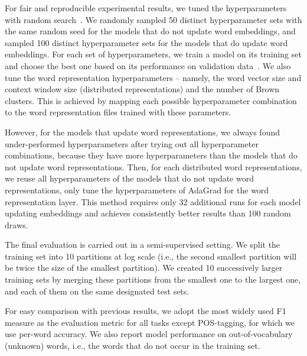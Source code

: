 For fair and reproducible experimental results, we tuned the hyperparameters with random search~\cite{bergstra2012random}. 
We randomly sampled 50 distinct hyperparameter sets with the same random seed for the models that do not update word embeddings, and sampled 100 distinct hyperparameter sets for the models that do update word embeddings. 
For each set of hyperparameters, we train a model on its training set and choose the best one based on its performance on validation data~\cite{turian2010word}. 
We also tune the word representation hyperparameters -- namely, the word vector size and context window size (distributed representations) and the number of Brown clusters.
This is achieved by mapping each possible hyperparameter combination to the word representation files trained with these parameters. 

However, for the models that update word representations, we always found under-performed hyperparameters after trying out all hyperparameter combinations, because they have more hyperparameters than the models that do not update word representations. Then, for each distributed word representations, we reuse all hyperparameters of the models that do not update word representations, only tune the hyperparameters of AdaGrad for the word representation layer. This method requires only 32 additional runs for each model updating embeddings and achieves consistently better results than 100 random draws.

The final evaluation is carried out in a semi-supervised setting. We split the training set into 10 partitions at log scale (i.e., the second smallest partition will be twice the size of the smallest partition). We created 10 successively larger training sets by merging these partitions from the smallest one to the largest one, and  each of them on the same designated test sets. 

For easy comparison with previous results, we adopt the most widely used F1 measure as the evaluation metric for all tasks except POS-tagging, for which we use per-word accuracy. We also report model performance on out-of-vocabulary (unknown) words, i.e., the words that do not occur in the training set.



